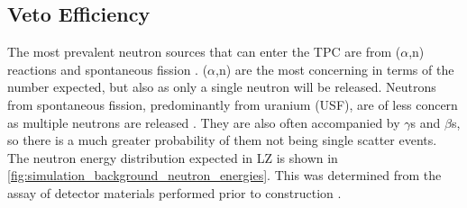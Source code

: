 \subsection{Veto Efficiency}
\label{sec:od_simulation_efficiency}
\par
The most prevalent neutron sources that can enter the TPC are from ($\alpha$,n) reactions and spontaneous fission \cite{LZ_projected_sensitivity_paper_ref}.
($\alpha$,n) are the most concerning in terms of the number expected, but also as only a single neutron will be released.
Neutrons from spontaneous fission, predominantly from uranium (USF), are of less concern as multiple neutrons are released \cite{usf_ref}.
They are also often accompanied by $\gamma$s and $\beta$s, so there is a much greater probability of them not being single scatter events.
The neutron energy distribution expected in LZ is shown in \autoref{fig:simulation_background_neutron_energies}.
This was determined from the assay of detector materials performed prior to construction \cite{LZ_assay_ref}.



